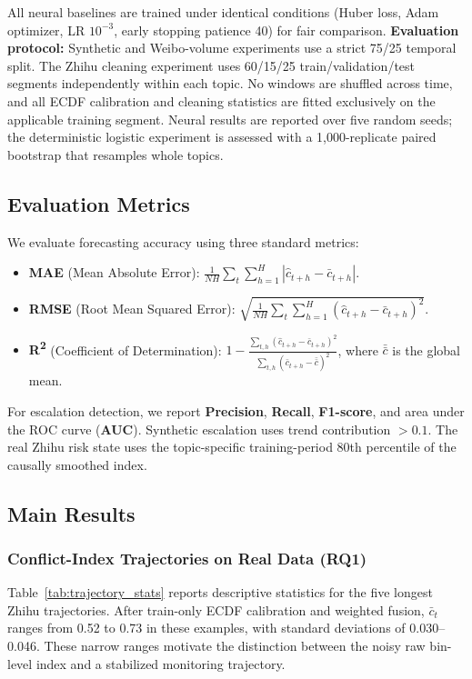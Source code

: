 \documentclass[journal]{IEEEtran}
\begin{document}
All neural baselines are trained under identical conditions (Huber loss, Adam optimizer, LR $10^{-3}$, early stopping patience 40) for fair comparison. \textbf{Evaluation protocol:} Synthetic and Weibo-volume experiments use a strict 75/25 temporal split. The Zhihu cleaning experiment uses 60/15/25 train/validation/test segments independently within each topic. No windows are shuffled across time, and all ECDF calibration and cleaning statistics are fitted exclusively on the applicable training segment. Neural results are reported over five random seeds; the deterministic logistic experiment is assessed with a 1,000-replicate paired bootstrap that resamples whole topics.

\subsection{Evaluation Metrics}

We evaluate forecasting accuracy using three standard metrics:
\begin{itemize}
\item \textbf{MAE} (Mean Absolute Error): $\frac{1}{N H}\sum_{t}\sum_{h=1}^{H}|\hat{c}_{t+h}-\bar{c}_{t+h}|$.
\item \textbf{RMSE} (Root Mean Squared Error): $\sqrt{\frac{1}{N H}\sum_{t}\sum_{h=1}^{H}(\hat{c}_{t+h}-\bar{c}_{t+h})^2}$.
\item \textbf{R\textsuperscript{2}} (Coefficient of Determination): $1 - \frac{\sum_{t,h}(\hat{c}_{t+h}-\bar{c}_{t+h})^2}{\sum_{t,h}(\bar{c}_{t+h}-\bar{\bar{c}})^2}$, where $\bar{\bar{c}}$ is the global mean.
\end{itemize}

For escalation detection, we report \textbf{Precision}, \textbf{Recall}, \textbf{F1-score}, and area under the ROC curve (\textbf{AUC}). Synthetic escalation uses trend contribution $>0.1$. The real Zhihu risk state uses the topic-specific training-period 80th percentile of the causally smoothed index.

\subsection{Main Results}
\label{sec:main_results}

\subsubsection{Conflict-Index Trajectories on Real Data (RQ1)}

Table~\ref{tab:trajectory_stats} reports descriptive statistics for the five longest Zhihu trajectories. After train-only ECDF calibration and weighted fusion, $\bar{c}_t$ ranges from 0.52 to 0.73 in these examples, with standard deviations of 0.030--0.046. These narrow ranges motivate the distinction between the noisy raw bin-level index and a stabilized monitoring trajectory.
\end{document}

